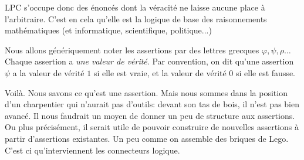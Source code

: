 \documentclass[french,course,oneside,theoremnosection]{lecture}
\begin{document}
LPC s'occupe donc des énoncés dont la véracité ne laisse aucune place à l'arbitraire. C'est en cela qu'elle est la logique de base des raisonnements mathématiques (et informatique, scientifique, politique...)

\begin{notation}
Nous allons génériquement noter les assertions par des lettres grecques $\varphi, \psi, \rho\ldots$ Chaque assertion a \emph{une valeur de vérité}. Par convention, on dit qu'une assertion $\psi$ a la valeur de vérité $1$ si elle est vraie, et la valeur de vérité $0$ si elle est fausse.
\end{notation}

Voilà. Nous savons ce qu'est une assertion. Mais nous sommes dans la position d'un charpentier qui n'aurait pas d'outils: devant son tas de bois, il n'est pas bien avancé. Il nous faudrait un moyen de donner un peu de structure aux assertions. Ou plus précisément, il serait utile de pouvoir construire de nouvelles assertions à partir d'assertions existantes. Un peu comme on assemble des briques de Lego\textregistered. C'est ci qu'interviennent les connecteurs logique.
\end{document}
